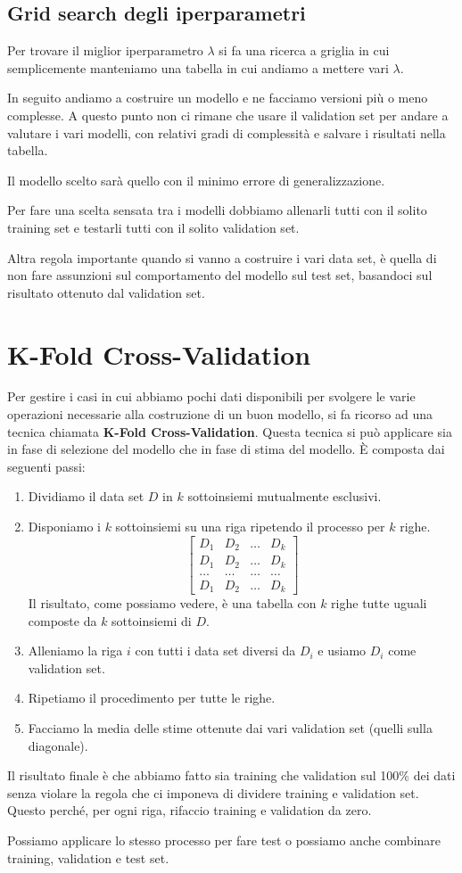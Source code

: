 \subsection{Grid search degli iperparametri}
Per trovare il miglior iperparametro $\lambda$ si fa una ricerca a griglia in cui semplicemente manteniamo una tabella
in cui andiamo a mettere vari $\lambda$.

In seguito andiamo a costruire un modello e ne facciamo versioni pi\`u o meno complesse. A questo punto non ci rimane che
usare il validation set per andare a valutare i vari modelli, con relativi gradi di complessit\`a e salvare i risultati
nella tabella.

Il modello scelto sar\`a quello con il minimo errore di generalizzazione.

Per fare una scelta sensata tra i modelli dobbiamo allenarli tutti con il solito training set e testarli tutti con il
solito validation set.

Altra regola importante quando si vanno a costruire i vari data set, \`e quella di non fare assunzioni sul comportamento
del modello sul test set, basandoci sul risultato ottenuto dal validation set.

\section{K-Fold Cross-Validation}
Per gestire i casi in cui abbiamo pochi dati disponibili per svolgere le varie operazioni necessarie alla costruzione di
un buon modello, si fa ricorso ad una tecnica chiamata \textbf{K-Fold Cross-Validation}. Questa tecnica si pu\`o applicare
sia in fase di selezione del modello che in fase di stima del modello. \`E composta dai seguenti passi:
\begin{enumerate}
	\item Dividiamo il data set $D$ in $k$ sottoinsiemi mutualmente esclusivi.
	\item Disponiamo i $k$ sottoinsiemi su una riga ripetendo il processo per $k$ righe.
	      \[
		      \begin{bmatrix}
			      D_1   & D_2   & \dots & D_k   \\
			      D_1   & D_2   & \dots & D_k   \\
			      \dots & \dots & \dots & \dots \\
			      D_1   & D_2   & \dots & D_k
		      \end{bmatrix}
	      \]
	      Il risultato, come possiamo vedere, \`e una tabella con $k$ righe tutte uguali composte da $k$ sottoinsiemi
	      di $D$.
	\item Alleniamo la riga $i$ con tutti i data set diversi da $D_i$ e usiamo $D_i$ come validation set.
	\item Ripetiamo il procedimento per tutte le righe.
	\item Facciamo la media delle stime ottenute dai vari validation set (quelli sulla diagonale).
\end{enumerate}
Il risultato finale \`e che abbiamo fatto sia training che validation sul 100\% dei dati senza violare la regola che ci
imponeva di dividere training e validation set. Questo perch\'e, per ogni riga, rifaccio training e validation da zero.

Possiamo applicare lo stesso processo per fare test o possiamo anche combinare training, validation e test set.
